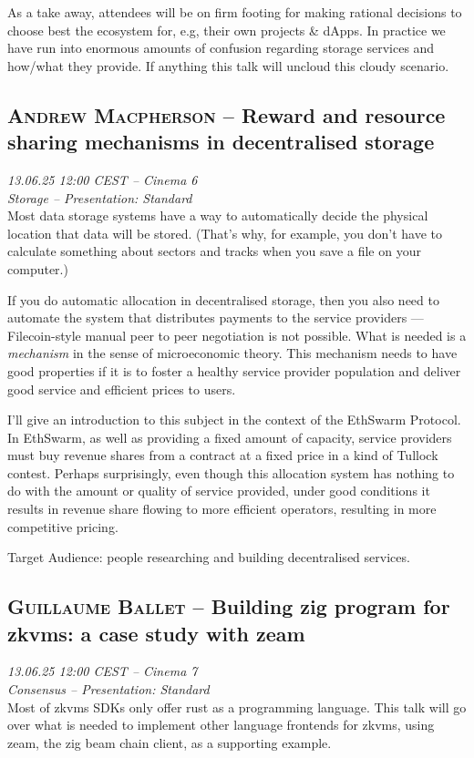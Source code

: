 As a take away, attendees will be on firm footing for making rational decisions to choose best the ecosystem for, e.g, their own projects \& dApps. In practice we have run into enormous amounts of confusion regarding storage services and how/what they provide. If anything this talk will uncloud this cloudy scenario.

\clearpage
\subsection {\textsc{Andrew Macpherson}  -- Reward and resource sharing mechanisms in decentralised storage} \noindent \textit {13.06.25 12:00 CEST -- Cinema 6\\ Storage -- Presentation: Standard}\\[1em] Most data storage systems have a way to automatically decide the physical location that data will be stored. (That's why, for example, you don't have to calculate something about sectors and tracks when you save a file on your computer.)

If you do automatic allocation in decentralised storage, then you also need to automate the system that distributes payments to the service providers — Filecoin-style manual peer to peer negotiation is not possible. What is needed is a \emph{mechanism} in the sense of microeconomic theory. This mechanism needs to have good properties if it is to foster a healthy service provider population and deliver good service and efficient prices to users.

I'll give an introduction to this subject in the context of the EthSwarm Protocol. In EthSwarm, as well as providing a fixed amount of capacity, service providers must buy revenue shares from a contract at a fixed price in a kind of Tullock contest. Perhaps surprisingly, even though this allocation system has nothing to do with the amount or quality of service provided, under good conditions it results in revenue share flowing to more efficient operators, resulting in more competitive pricing.

Target Audience: people researching and building decentralised services.

\clearpage
\subsection {\textsc{Guillaume Ballet}  -- Building zig program for zkvms: a case study with zeam} \noindent \textit {13.06.25 12:00 CEST -- Cinema 7\\ Consensus -- Presentation: Standard}\\[1em] Most of zkvms SDKs only offer rust as a programming language. This talk will go over what is needed to implement other language frontends for zkvms, using zeam, the zig beam chain client, as a supporting example.


